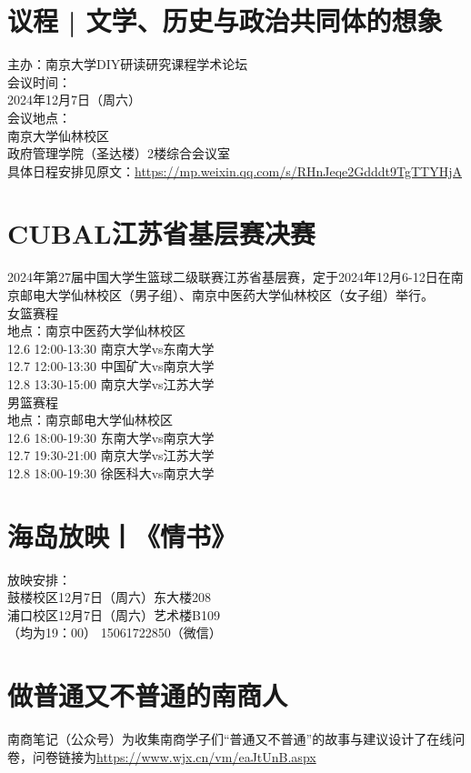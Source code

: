 \documentclass[letterpaper, 12pt]{article}
\begin{document}
\begin{multicols}{2}
\section{议程 | 文学、历史与政治共同体的想象}
主办：南京大学DIY研读研究课程学术论坛\\
会议时间：\\
2024年12月7日（周六）\\
会议地点：\\
南京大学仙林校区\\
政府管理学院（圣达楼）2楼综合会议室\\
具体日程安排见原文：\url{https://mp.weixin.qq.com/s/RHnJeqe2Gdddt9TgTTYHjA}

\section{CUBAL江苏省基层赛决赛}
2024年第27届中国大学生篮球二级联赛江苏省基层赛，定于2024年12月6-12日在南京邮电大学仙林校区（男子组）、南京中医药大学仙林校区（女子组）举行。\\
女篮赛程\\
地点：南京中医药大学仙林校区\\
12.6 12:00-13:30 南京大学vs东南大学\\
12.7 12:00-13:30 中国矿大vs南京大学\\
12.8 13:30-15:00 南京大学vs江苏大学\\
男篮赛程\\
地点：南京邮电大学仙林校区\\
12.6 18:00-19:30 东南大学vs南京大学\\
12.7 19:30-21:00 南京大学vs江苏大学\\
12.8 18:00-19:30 徐医科大vs南京大学\\

\section{海岛放映丨《情书》}
放映安排：\\
鼓楼校区12月7日（周六）东大楼208\\
浦口校区12月7日（周六）艺术楼B109\\
（均为19：00）
15061722850（微信）\\

\section{做普通又不普通的南商人}
南商笔记（公众号）为收集南商学子们“普通又不普通”的故事与建议设计了在线问卷，问卷链接为\url{https://www.wjx.cn/vm/eaJtUnB.aspx}\\


\end{multicols}
\end{document}
